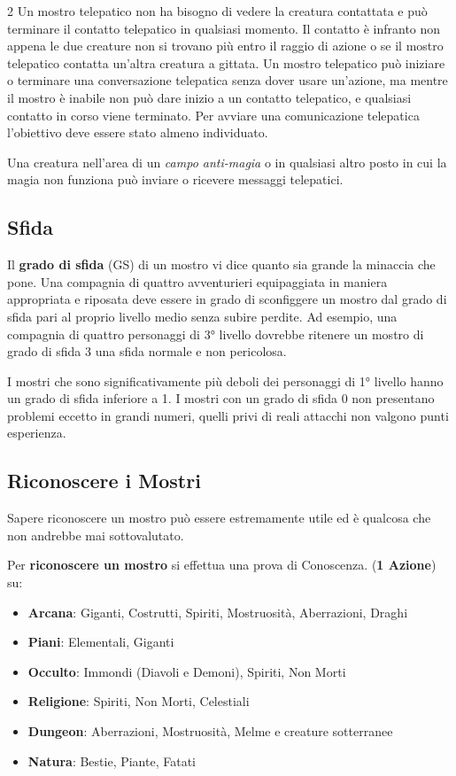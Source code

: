 \begin{multicols}{2}
Un mostro telepatico non ha bisogno di vedere la creatura contattata e può terminare il contatto telepatico in qualsiasi momento. Il contatto è infranto non appena le due creature non si trovano più entro il raggio di azione o se il mostro telepatico contatta un'altra creatura a gittata. Un mostro telepatico può iniziare o terminare una conversazione telepatica senza dover usare un'azione, ma mentre il mostro è inabile non può dare inizio a un contatto telepatico, e qualsiasi contatto in corso viene terminato. Per avviare una comunicazione telepatica l'obiettivo deve essere stato almeno individuato.

Una creatura nell'area di un \emph{campo anti-magia} o in qualsiasi altro posto in cui la magia non funziona può inviare o ricevere messaggi telepatici.

\subsection{Sfida}

Il \textbf{grado di sfida} (GS) di un mostro vi dice quanto sia grande la minaccia che pone. Una compagnia di quattro avventurieri equipaggiata in maniera appropriata e riposata deve essere in grado di sconfiggere un mostro dal grado di sfida pari al proprio livello medio senza subire perdite. Ad esempio, una compagnia di quattro personaggi di 3° livello dovrebbe ritenere un mostro di grado di sfida 3 una sfida normale e non pericolosa.

I mostri che sono significativamente più deboli dei personaggi di 1° livello hanno un grado di sfida inferiore a 1. I mostri con un grado di sfida 0 non presentano problemi eccetto in grandi numeri, quelli privi di reali attacchi non valgono punti esperienza.

\subsection{Riconoscere i Mostri}\label{riconoscereimostri}\hypertarget{riconoscereimostri}{} 

Sapere riconoscere un mostro può essere estremamente utile ed è qualcosa che non andrebbe mai sottovalutato.

Per \textbf{riconoscere un mostro} si effettua una prova di Conoscenza. (\textbf{1 Azione}) su:

\medskip

\noindent\begin{itemize}[leftmargin=*] \setlength{\itemsep}{0pt}
\item \textbf{Arcana}: Giganti, Costrutti, Spiriti, Mostruosità, Aberrazioni, Draghi
\item \textbf{Piani}: Elementali, Giganti
\item \textbf{Occulto}: Immondi (Diavoli e Demoni), Spiriti, Non Morti
\item \textbf{Religione}: Spiriti, Non Morti, Celestiali
\item \textbf{Dungeon}: Aberrazioni, Mostruosità, Melme e creature sotterranee
\item \textbf{Natura}: Bestie, Piante, Fatati
\end{itemize}


\end{multicols}
